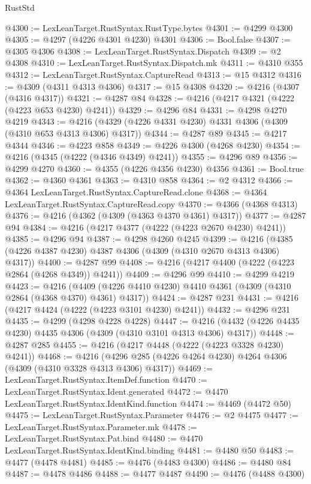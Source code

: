 \begin{lexlean}{RustStd}
\begin{coremodule}
@4300 := LexLeanTarget.RustSyntax.RustType.bytes
@4301 := @4299 @4300
@4305 := @4297 (@4226 @4301 @4230) @4301
@4306 := Bool.false
@4307 := @4305 @4306
@4308 := LexLeanTarget.RustSyntax.Dispatch
@4309 := @2 @4308
@4310 := LexLeanTarget.RustSyntax.Dispatch.mk
@4311 := @4310 @355
@4312 := LexLeanTarget.RustSyntax.CaptureRead
@4313 := @15 @4312
@4316 := @4309 (@4311 @4313 @4306)
@4317 := @15 @4308
@4320 := @4216 (@4307 (@4316 @4317))
@4321 := @4287 @84
@4328 := @4216 (@4217 @4321 (@4222 (@4223 @653 @4230) @4241))
@4329 := @4296 @84
@4331 := @4298 @4270 @4219
@4343 := @4216 (@4329 (@4226 @4331 @4230) @4331 @4306 (@4309 (@4310 @653 @4313 @4306) @4317))
@4344 := @4287 @89
@4345 := @4217 @4344
@4346 := @4223 @858
@4349 := @4226 @4300 (@4268 @4230)
@4354 := @4216 (@4345 (@4222 (@4346 @4349) @4241))
@4355 := @4296 @89
@4356 := @4299 @4270
@4360 := @4355 (@4226 @4356 @4230) @4356
@4361 := Bool.true
@4362 := @4360 @4361
@4363 := @4310 @858
@4364 := @2 @4312
@4366 := @4364 LexLeanTarget.RustSyntax.CaptureRead.clone
@4368 := @4364 LexLeanTarget.RustSyntax.CaptureRead.copy
@4370 := @4366 (@4368 @4313)
@4376 := @4216 (@4362 (@4309 (@4363 @4370 @4361) @4317))
@4377 := @4287 @94
@4384 := @4216 (@4217 @4377 (@4222 (@4223 @2670 @4230) @4241))
@4385 := @4296 @94
@4387 := @4298 @4260 @4245
@4399 := @4216 (@4385 (@4226 @4387 @4230) @4387 @4306 (@4309 (@4310 @2670 @4313 @4306) @4317))
@4400 := @4287 @99
@4408 := @4216 (@4217 @4400 (@4222 (@4223 @2864 (@4268 @4349)) @4241))
@4409 := @4296 @99
@4410 := @4299 @4219
@4423 := @4216
    (@4409 (@4226 @4410 @4230) @4410 @4361 (@4309 (@4310 @2864 (@4368 @4370) @4361) @4317))
@4424 := @4287 @231
@4431 := @4216 (@4217 @4424 (@4222 (@4223 @3101 @4230) @4241))
@4432 := @4296 @231
@4435 := @4299 (@4298 @4228 @4228)
@4447 := @4216 (@4432 (@4226 @4435 @4230) @4435 @4306 (@4309 (@4310 @3101 @4313 @4306) @4317))
@4448 := @4287 @285
@4455 := @4216 (@4217 @4448 (@4222 (@4223 @3328 @4230) @4241))
@4468 := @4216 (@4296 @285 (@4226 @4264 @4230) @4264 @4306 (@4309 (@4310 @3328 @4313 @4306) @4317))
@4469 := LexLeanTarget.RustSyntax.ItemDef.function
@4470 := LexLeanTarget.RustSyntax.Ident.generated
@4472 := @4470 LexLeanTarget.RustSyntax.IdentKind.function
@4474 := @4469 (@4472 @50)
@4475 := LexLeanTarget.RustSyntax.Parameter
@4476 := @2 @4475
@4477 := LexLeanTarget.RustSyntax.Parameter.mk
@4478 := LexLeanTarget.RustSyntax.Pat.bind
@4480 := @4470 LexLeanTarget.RustSyntax.IdentKind.binding
@4481 := @4480 @50
@4483 := @4477 (@4478 @4481)
@4485 := @4476 (@4483 @4300)
@4486 := @4480 @84
@4487 := @4478 @4486
@4488 := @4477 @4487
@4490 := @4476 (@4488 @4300)

\end{coremodule}
\end{lexlean}
